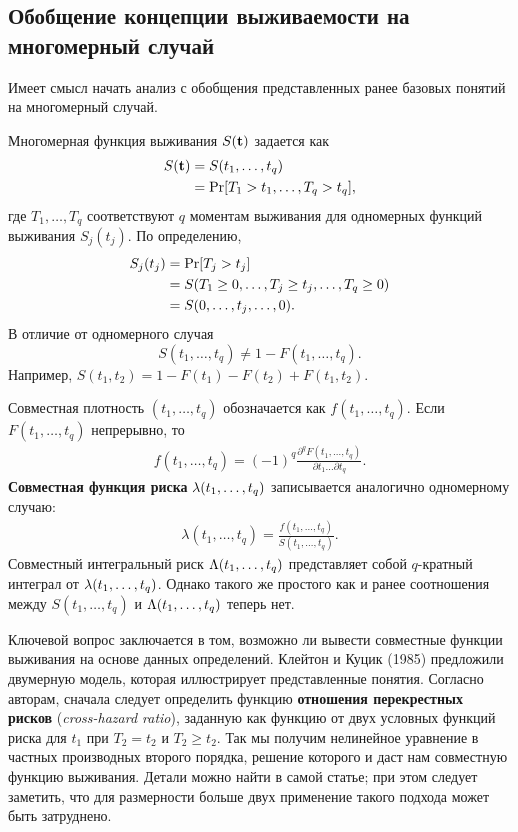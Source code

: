 \subsection{Обобщение концепции выживаемости на многомерный случай}\label{sec:19.3.1}

\noindent
Имеет смысл начать анализ с обобщения представленных ранее базовых понятий на многомерный случай.

Многомерная функция выживания $S(\bt)$ задается как
    \begin{align}\label{eq:19.13}
    S(\bt)    &= S(t_1,\ldots ,t_q) \\
            &= \Pr [T_1>t_1,\ldots ,T_q>t_q], \notag
    \end{align}
где $T_1, \ldots , T_q$ соответствуют $q$ моментам выживания для одномерных функций выживания $S_j(t_j)$. По определению,
    \begin{align}\label{eq:19.14}
    S_j(t_j)    &= \Pr [T_j>t_j] \\
                &= S(T_1 \ge 0,\ldots , T_j \ge t_j, \ldots , T_q \ge 0) \notag \\
                &= S(0,\ldots ,t_j, \ldots ,0). \notag
    \end{align}
В отличие от одномерного случая
    $$ S(t_1, \ldots , t_q) \ne 1-F(t_1, \ldots , t_q).$$
Например, $S(t_1,t_2) = 1-F(t_1)-F(t_2)+F(t_1,t_2)$.

Совместная плотность $(t_1, \ldots , t_q)$ обозначается как $f(t_1, \ldots , t_q)$. Если $F(t_1, \ldots , t_q)$ непрерывно, то
    \begin{align}\label{eq:19.15}
    f(t_1, \ldots , t_q) = (-1)^q \frac{\partial^q F(t_1,\ldots  , t_q)}{\partial t_1\ldots \partial t_q}.
    \end{align}
\textbf{Совместная функция риска} $\la(t_1, \ldots , t_q)$ записывается аналогично одномерному случаю:
    \begin{align}\label{eq:19.16}
    \lambda(t_1, \ldots , t_q) = \frac{f(t_1, \ldots , t_q)}{S(t_1, \ldots , t_q)}.
    \end{align}
Совместный интегральный риск $\La(t_1, \ldots , t_q)$ представляет собой $q$-кратный интеграл от $\la(t_1, \ldots , t_q)$. Однако такого же простого как и ранее соотношения между $S(t_1, \ldots , t_q)$ и $\La(t_1, \ldots , t_q)$ теперь нет.

Ключевой вопрос заключается в том, возможно ли вывести совместные функции выживания на основе данных определений. Клейтон и Куцик (1985) предложили двумерную модель, которая иллюстрирует представленные понятия. Согласно авторам, сначала следует определить функцию \textbf{отношения перекрестных рисков} (\textit{cross-hazard ratio}), заданную как функцию от двух условных функций риска для $t_1$ при $T_2 = t_2$ и $T_2 \ge t_2$. Так мы получим нелинейное уравнение в частных производных второго порядка, решение которого и даст нам совместную функцию выживания. Детали можно найти в самой статье; при этом следует заметить, что для размерности больше двух применение такого подхода может быть затруднено.


